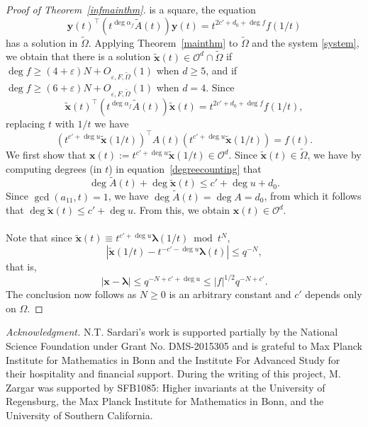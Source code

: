 \documentclass[10pt]{amsart}
\theoremstyle{plain}
\theoremstyle{plain}
\renewcommand{\vec}[1]{\mathbf{#1}}
\theoremstyle{remark}
\theoremstyle{definition}
\begin{document}
\begin{proof}[Proof of Theorem~\ref{infmainthm}]
is a square, the equation 
\[\vec{y}(t)^{\intercal}\left(t^{\deg\alpha_f}\tilde{A}(t)\right)\vec{y}(t)=t^{2c'+d_0+\deg f}f(1/t)\] has a solution in $\tilde{\Omega}$. Applying Theorem~\ref{mainthm} to $\tilde{\Omega}$ and the system \eqref{system}, we obtain that there is a solution $\tilde{\vec{x}}(t)\in\mathcal{O}^d\cap\tilde{\Omega}$ if $\deg f\geq (4+\varepsilon)N+O_{\varepsilon,F,\tilde{\Omega}}(1)$ when $d\geq 5$, and if $\deg f\geq (6+\varepsilon)N+O_{\varepsilon,F,\tilde{\Omega}}(1)$ when $d=4$. Since
\begin{equation}\label{degreecounting}\tilde{\vec{x}}(t)^{\intercal}\left(t^{\deg\alpha_f}\tilde{A}(t)\right)\tilde{\vec{x}}(t)=t^{2c'+d_0+\deg f}f(1/t),\end{equation}
replacing $t$ with $1/t$ we have
\[\left(t^{c'+\deg u}\tilde{\vec{x}}(1/t)\right)^{\intercal}A(t)\left(t^{c'+\deg u}\tilde{\vec{x}}(1/t)\right)=f(t).\]
We first show that $\vec{x}(t):=t^{c'+\deg u}\tilde{\vec{x}}(1/t)\in\mathcal{O}^d$. Since $\tilde{\vec{x}}(t)\in\tilde{\Omega}$, we have by computing degrees (in $t$) in equation~\eqref{degreecounting} that
\[\deg\tilde{A}(t)+\deg\tilde{\vec{x}}(t)\leq c'+\deg u+d_0.\]
Since $\gcd(a_{11},t)=1$, we have $\deg\tilde{A}(t)=\deg A=d_0$, from which it follows that $\deg\tilde{\vec{x}}(t)\leq c'+\deg u$. From this, we obtain $\vec{x}(t)\in\mathcal{O}^d$.\\
\\
Note that since $\tilde{\vec{x}}(t)\equiv t^{c'+\deg u}\boldsymbol{\lambda}(1/t)\bmod t^N$, 
\[\left|\tilde{\vec{x}}(1/t)-t^{-c'-\deg u}\boldsymbol{\lambda}(t)\right|\leq q^{-N},\]
that is,
\[\left|\vec{x}-\boldsymbol{\lambda}\right|\leq q^{-N+c'+\deg u}\leq |f|^{1/2}q^{-N+c'}.\]
The conclusion now follows as $N\geq 0$ is an arbitrary constant and $c'$ depends only on $\Omega$.

\end{proof}
\textit{Acknowledgment.} N.T. Sardari's work is supported partially by the National Science Foundation under Grant No. DMS-2015305 and is grateful to Max Planck Institute for Mathematics in Bonn and the Institute
For Advanced Study for their hospitality and financial support. During the writing of this project, M. Zargar was supported by SFB1085: Higher invariants at the University of Regensburg, the Max Planck Institute for Mathematics in Bonn, and the University of Southern California.


\end{document}
